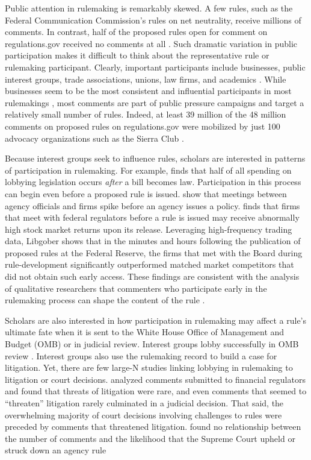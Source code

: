 \documentclass[
      12pt,
        ]{article}
\begin{document}
Public attention in rulemaking is remarkably skewed. A few rules, such
as the Federal Communication Commission's rules on net neutrality,
receive millions of comments. In contrast, half of the proposed rules
open for comment on regulations.gov received no comments at all
\citep{LibgoberJOP}. Such dramatic variation in public participation
makes it difficult to think about the representative rule or rulemaking
participant. Clearly, important participants include businesses, public
interest groups, trade associations, unions, law firms, and academics
\citep{CuellarALR2005, YackeeJOP2006}. While businesses seem to be the
most consistent and influential participants in most rulemakings
\citep{YackeeJOP2006, LibgoberJOP}, most comments are part of public
pressure campaigns and target a relatively small number of rules.
Indeed, at least 39 million of the 48 million comments on proposed rules
on regulations.gov were mobilized by just 100 advocacy organizations
such as the Sierra Club \citep{judgelord2019SPSA}.

Because interest groups seek to influence rules, scholars are interested
in patterns of participation in rulemaking. For example,
\citet{YouJOP2017} finds that half of all spending on lobbying
legislation occurs \emph{after} a bill becomes law. Participation in
this process can begin even before a proposed rule is issued.
\citet{deFigureidoKimICC2004} show that meetings between agency
officials and firms spike before an agency issues a policy.
\citet{LibgoberQJPS} finds that firms that meet with federal regulators
before a rule is issued may receive abnormally high stock market returns
upon its release. Leveraging high-frequency trading data, Libgober shows
that in the minutes and hours following the publication of proposed
rules at the Federal Reserve, the firms that met with the Board during
rule-development significantly outperformed matched market competitors
that did not obtain such early access. These findings are consistent
with the analysis of qualitative researchers that commenters who
participate early in the rulemaking process can shape the content of the
rule \citep{NaughtonJPAM2009}.

Scholars are also interested in how participation in rulemaking may
affect a rule's ultimate fate when it is sent to the White House Office
of Management and Budget (OMB) or in judicial review. Interest groups
lobby successfully in OMB review \citep{HaederAPSR2015}. Interest groups
also use the rulemaking record to build a case for litigation. Yet,
there are few large-N studies linking lobbying in rulemaking to
litigation or court decisions. \citet{LibgoberRashin2018SPSA} analyzed
comments submitted to financial regulators and found that threats of
litigation were rare, and even comments that seemed to ``threaten''
litigation rarely culminated in a judicial decision. That said, the
overwhelming majority of court decisions involving challenges to rules
were preceded by comments that threatened litigation.
\citet{judgelord2016MPSA} found no relationship between the number of
comments and the likelihood that the Supreme Court upheld or struck down
an agency rule
\end{document}
